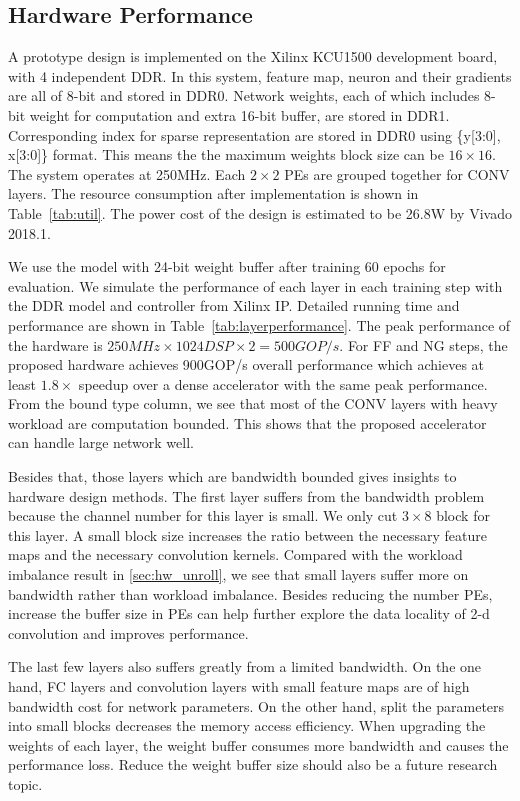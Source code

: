 

\subsection{Hardware Performance}
A prototype design is implemented on the Xilinx KCU1500 development board, with 4 independent DDR. In this system, feature map, neuron and their gradients are all of 8-bit and stored in DDR0. Network weights, each of which includes 8-bit weight for computation and extra 16-bit buffer, are stored in DDR1. Corresponding index for sparse representation are stored in DDR0 using \{y[3:0], x[3:0]\} format. This means the the maximum weights block size can be $16\times 16$. The system operates at 250MHz. Each $2\times 2$ PEs are grouped together for CONV layers. The resource consumption after implementation is shown in Table~\ref{tab:util}. The power cost of the design is estimated to be 26.8W by Vivado 2018.1.   



We use the model with 24-bit weight buffer after training 60 epochs for evaluation. We simulate the performance of each layer in each training step with the DDR model and controller from Xilinx IP. Detailed running time and performance are shown in Table~\ref{tab:layerperformance}. The peak performance of the hardware is $250MHz \times 1024DSP \times 2 = 500GOP/s$. For FF and NG steps, the proposed hardware achieves 900GOP/s overall performance which achieves at least $1.8\times$ speedup over a dense accelerator with the same peak performance. From the bound type column, we see that most of the CONV layers with heavy workload are computation bounded. This shows that the proposed accelerator can handle large network well.

Besides that, those layers which are bandwidth bounded gives insights to hardware design methods. The first layer suffers from the bandwidth problem because the channel number for this layer is small. We only cut $3\times 8$ block for this layer. A small block size increases the ratio between the necessary feature maps and the necessary convolution kernels. Compared with the workload imbalance result in \ref{sec:hw_unroll}, we see that small layers suffer more on bandwidth rather than workload imbalance. Besides reducing the number PEs, increase the buffer size in PEs can help further explore the data locality of 2-d convolution and improves performance. 

The last few layers also suffers greatly from a limited bandwidth. On the one hand, FC layers and convolution layers with small feature maps are of high bandwidth cost for network parameters. On the other hand, split the parameters into small blocks decreases the memory access efficiency. When upgrading the weights of each layer, the weight buffer consumes more bandwidth and causes the performance loss. Reduce the weight buffer size should also be a future research topic. 

